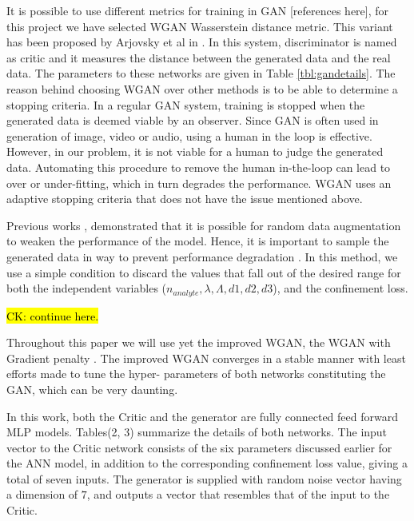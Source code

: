 \documentclass[draft, 10pt]{IEEEtran}
\begin{document}
It is possible to use different metrics for training in GAN [references here], for this project we have selected WGAN Wasserstein distance metric. This variant has been proposed by Arjovsky et al in \cite{arjovsky2017wasserstein}. In this system, discriminator is named as critic and it measures the distance between the generated data and the real data. The parameters to these networks are given in Table \ref{tbl:gandetails}. The reason behind choosing WGAN over other methods is to be able to determine a stopping criteria. In a regular GAN system, training is stopped when the generated data is deemed viable by an observer. Since GAN is often used in generation of image, video or audio, using a human in the loop is effective. However, in our problem, it is not viable for a human to judge the generated data. Automating this procedure to remove the human in-the-loop can lead to over or under-fitting, which in turn degrades the performance. WGAN uses an adaptive stopping criteria that does not have the issue mentioned above.

Previous works \cite{ravuri2019seeing, shmelkov2018good}, demonstrated that it is possible for random data augmentation to weaken the performance of the model. Hence, it is important to sample the generated data in way to prevent performance degradation \cite{bhattarai2019sampling}. In this method, we use a simple condition to discard the values that fall out of the desired range for both the independent variables ($n_{analyte}, \lambda, \Lambda, d1, d2, d3$), and the confinement loss.

\hl{CK: continue here.}

Throughout this paper we will use yet the improved WGAN, the WGAN with Gradient penalty \cite{gulrajani2017improved}. The improved WGAN converges in a stable manner with least efforts made to tune the hyper- parameters of both networks constituting the GAN, which can be very daunting.

In this work, both the Critic and the generator are fully connected feed forward MLP models. Tables(2, 3) summarize the details of both networks. The input vector to the Critic network consists of the six parameters discussed earlier for the ANN model, in addition to the corresponding confinement loss value, giving a total of seven inputs. The generator is supplied with random noise vector having a dimension of $7$, and outputs a vector that resembles that of the input to the Critic.
\end{document}
